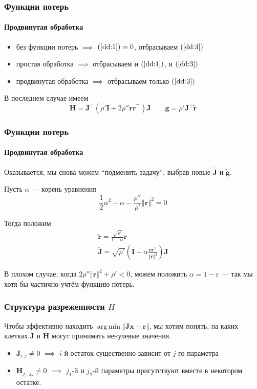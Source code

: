 \documentclass[notheorems,aspectratio=169]{beamer}
\DeclareMathOperator*{\argmin}{arg\,min}
\begin{document}
\begin{frame}
  \frametitle{Функции потерь}
  \framesubtitle{Продвинутая обработка}
  \begin{itemize}
    \item без функции потерь $\implies$ $(\ref{dd:1})=0$, отбрасываем $(\ref{dd:3})$
    \item простая обработка $\implies$ отбрасываем и $(\ref{dd:1})$, и $(\ref{dd:3})$ 
    \item продвинутая обработка $\implies$ отбрасываем только $(\ref{dd:3})$
  \end{itemize}

  В последнем случае имеем
  $$\mathbf{H}=\mathbf{J}^\intercal\left(\rho'\mathbf{I}+2\rho''\mathbf{r}\mathbf{r}^\intercal\right)\mathbf{J} \qquad \mathbf{g}=\rho'\mathbf{J}^\intercal\tilde{\mathbf{r}}$$
\end{frame}

\begin{frame}
  \frametitle{Функции потерь}
  \framesubtitle{Продвинутая обработка}
  Оказывается, мы снова можем ``подменить задачу'', выбрав новые $\tilde{\mathbf{J}}$ и $\tilde{\mathbf{g}}$. 

  Пусть $\alpha$ --- корень уравнения 
  $$\frac{1}{2}\alpha^2-\alpha-\frac{\rho''}{\rho'}\left\Vert\mathbf{r}\right\Vert^2=0$$

  Тогда положим
  \begin{equation*}
    \begin{gathered}
      \tilde{\mathbf{r}}=\frac{\sqrt{\rho'}}{1-\alpha}\mathbf{r} \\
      \tilde{\mathbf{J}}=\sqrt{\rho'}\left(\mathbf{I}-\alpha\frac{\mathbf{r}\mathbf{r}^\intercal}{\left\Vert\mathbf{r}\right\Vert^2}\right)\mathbf{J}
    \end{gathered}
  \end{equation*}

  В плохом случае, когда $2\rho''\left\Vert\mathbf{r}\right\Vert^2+\rho'<0$, можем положить $\alpha=1-\varepsilon$ --- так мы хотя бы частично учтём функцию потерь.
\end{frame}

\begin{frame}
  \frametitle{Структура разреженности $H$}
  Чтобы эффективно находить $\argmin\left\Vert\mathbf{J}\mathbf{x}-\mathbf{r}\right\Vert$, мы хотим понять, на каких клетках $\mathbf{J}$ и $\mathbf{H}$ могут принимать ненулевые значения.
  \begin{itemize}
    \item $\mathbf{J}_{i,j}\neq 0$ $\implies$ $i$-й остаток существенно зависит от $j$-го параметра
    \item $\mathbf{H}_{j_1,j_2}\neq 0$ $\implies$ $j_1$-й и $j_2$-й параметры присутствуют вместе в некотором остатке.
 \end{itemize}
\end{frame}
\end{document}
